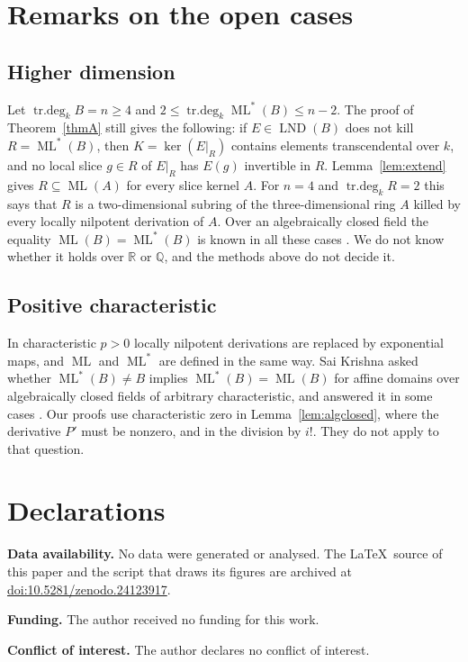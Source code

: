 \documentclass[11pt]{amsart}
\theoremstyle{definition}
\newcommand{\RR}{\mathbb{R}}
\newcommand{\QQ}{\mathbb{Q}}
\DeclareMathOperator{\ML}{ML}
\DeclareMathOperator{\LND}{LND}
\DeclareMathOperator{\trdeg}{tr.deg}
\newcommand{\MLs}{\ML^{*}}
\newcommand{\td}[1]{\trdeg_k #1}
\newcommand{\zenodoCodeDOI}{10.5281/zenodo.24123917}
\begin{document}
\section{Remarks on the open cases}\label{sec:open}

\subsection*{Higher dimension}
Let $\td{B}=n\ge4$ and $2\le\td{\MLs(B)}\le n-2$. The proof of Theorem~\ref{thmA} still gives the following: if $E\in\LND(B)$ does not kill $R=\MLs(B)$, then $K=\ker(E|_R)$ contains elements transcendental over $k$, and no local slice $g\in R$ of $E|_R$ has $E(g)$ invertible in $R$. Lemma~\ref{lem:extend} gives $R\subseteq\ML(A)$ for every slice kernel $A$. For $n=4$ and $\td R=2$ this says that $R$ is a two-dimensional subring of the three-dimensional ring $A$ killed by every locally nilpotent derivation of $A$. Over an algebraically closed field the equality $\ML(B)=\MLs(B)$ is known in all these cases \cite{GS24}. We do not know whether it holds over $\RR$ or $\QQ$, and the methods above do not decide it.

\subsection*{Positive characteristic}
In characteristic $p>0$ locally nilpotent derivations are replaced by exponential maps, and $\ML$ and $\MLs$ are defined in the same way. Sai Krishna asked whether $\MLs(B)\neq B$ implies $\MLs(B)=\ML(B)$ for affine domains over algebraically closed fields of arbitrary characteristic, and answered it in some cases \cite{Sai24}. Our proofs use characteristic zero in Lemma~\ref{lem:algclosed}, where the derivative $P'$ must be nonzero, and in the division by $i!$. They do not apply to that question.

\section*{Declarations}

\noindent\textbf{Data availability.} No data were generated or analysed. The \LaTeX\ source of this paper and the script that draws its figures are archived at \href{https://doi.org/\zenodoCodeDOI}{doi:\zenodoCodeDOI}.

\smallskip\noindent\textbf{Funding.} The author received no funding for this work.

\smallskip\noindent\textbf{Conflict of interest.} The author declares no conflict of interest.
\end{document}
